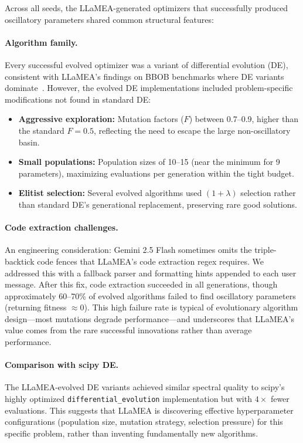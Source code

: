 \documentclass[11pt,a4paper]{article}
\begin{document}
Across all seeds, the LLaMEA-generated optimizers that successfully produced oscillatory parameters shared common structural features:

\paragraph{Algorithm family.}
Every successful evolved optimizer was a variant of differential evolution (DE), consistent with LLaMEA's findings on BBOB benchmarks where DE variants dominate~\citep{vanStein2025}.
However, the evolved DE implementations included problem-specific modifications not found in standard DE:

\begin{itemize}
    \item \textbf{Aggressive exploration:} Mutation factors ($F$) between 0.7--0.9, higher than the standard $F = 0.5$, reflecting the need to escape the large non-oscillatory basin.
    \item \textbf{Small populations:} Population sizes of 10--15 (near the minimum for 9 parameters), maximizing evaluations per generation within the tight budget.
    \item \textbf{Elitist selection:} Several evolved algorithms used $(1+\lambda)$ selection rather than standard DE's generational replacement, preserving rare good solutions.
\end{itemize}

\paragraph{Code extraction challenges.}
An engineering consideration: Gemini 2.5 Flash sometimes omits the triple-backtick code fences that LLaMEA's code extraction regex requires.
We addressed this with a fallback parser and formatting hints appended to each user message.
After this fix, code extraction succeeded in all generations, though approximately 60--70\% of evolved algorithms failed to find oscillatory parameters (returning fitness $\approx 0$).
This high failure rate is typical of evolutionary algorithm design—most mutations degrade performance—and underscores that LLaMEA's value comes from the rare successful innovations rather than average performance.

\paragraph{Comparison with scipy DE.}
The LLaMEA-evolved DE variants achieved similar spectral quality to scipy's highly optimized \texttt{differential\_evolution} implementation but with $4\times$ fewer evaluations.
This suggests that LLaMEA is discovering effective hyperparameter configurations (population size, mutation strategy, selection pressure) for this specific problem, rather than inventing fundamentally new algorithms.
\end{document}

